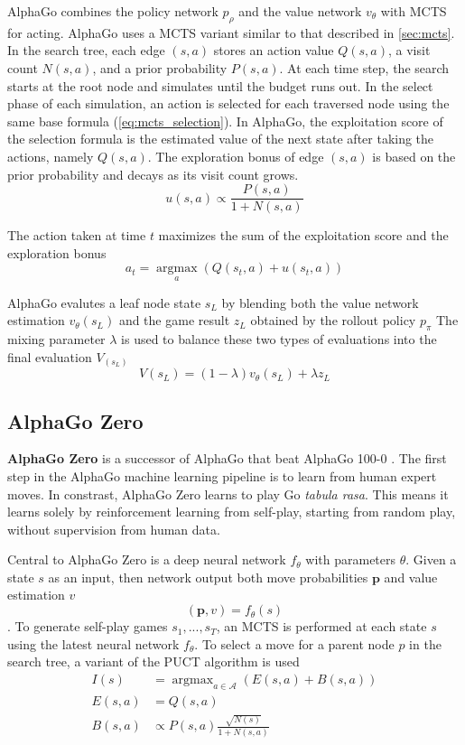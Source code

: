 \documentclass[12pt]{article}
\begin{document}
AlphaGo combines the policy network $p_{\rho}$ and the value network $v_{\theta}$ with MCTS for acting.
AlphaGo uses a MCTS variant similar to that described in \ref{sec:mcts}.
In the search tree, each edge $(s, a)$ stores an action value $Q(s, a)$, a visit count $N(s, a)$, and a prior probability $P(s, a)$.
At each time step, the search starts at the root node and simulates until the budget runs out.
In the select phase of each simulation, an action is selected for each traversed node using the same base formula (\ref{eq:mcts_selection}).
In AlphaGo, the exploitation score of the selection formula is the estimated value of the next state after taking the actions, namely $Q(s, a)$.
The exploration bonus of edge $(s, a)$ is based on the prior probability and decays as its visit count grows.
\begin{equation}
    u(s, a) \propto \frac{P(s, a)}{1 + N(s, a)}
\end{equation}

The action taken at time $t$ maximizes the sum of the exploitation score and the exploration bonus
\begin{equation}
    a_{t}=\underset{a}{\operatorname{argmax}}\left(Q\left(s_{t}, a\right)+u\left(s_{t}, a\right)\right)
\end{equation}

AlphaGo evalutes a leaf node state $s_L$ by blending both the value network estimation $v_\theta(s_L)$ and the game result $z_L$ obtained by the rollout policy $p_\pi$
The mixing parameter $\lambda$ is used to balance these two types of evaluations into the final evaluation $V_(s_L)$
$$
    V\left(s_{L}\right)=(1-\lambda) v_{\theta}\left(s_{L}\right)+\lambda z_{L}
$$

\subsection{AlphaGo Zero}
\textbf{AlphaGo Zero} is a successor of AlphaGo that beat AlphaGo 100-0 \cite{MasteringGameGo_Silver.Schrittwieser.ea_2017}.
The first step in the AlphaGo machine learning pipeline is to learn from human expert moves.
In constrast, AlphaGo Zero learns to play Go \textit{tabula rasa}.
This means it learns solely by reinforcement learning from self-play, starting from random play, without supervision from human data.

Central to AlphaGo Zero is a deep neural network $f_\theta$ with parameters $\theta$.
Given a state $s$ as an input, then network output both move probabilities $\pmb{p}$ and value estimation $v$
$$(\pmb{p}, v) = f_\theta(s)$$.
To generate self-play games $s_1, ..., s_T$, an MCTS is performed at each state $s$ using the latest neural network $f_\theta$.
To select a move for a parent node $p$ in the search tree, a variant of the PUCT algorithm is used
\begin{align*}
    I(s)     & = \operatorname{argmax}_{a \in \mathcal{A}} \left( E(s, a) + B(s, a) \right)  \\
    E(s, a)  & = Q(s, a)  \\
    B(s, a)  & \propto P(s, a) \frac{\sqrt{N(s)}}{1+N(s, a)}
\end{align*}
\end{document}
